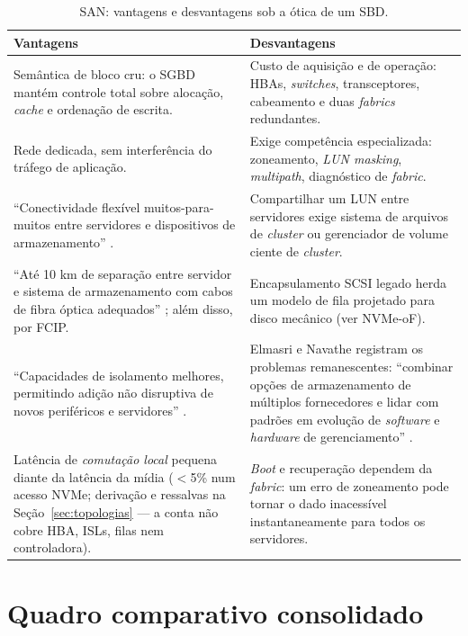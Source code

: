 \documentclass[11pt,a4paper]{article}
\begin{document}
\begin{table}[H]
\centering
\caption{SAN: vantagens e desvantagens sob a ótica de um SBD.}
\label{tab:vantsan}
{\footnotesize
\begin{tabular}{@{}p{7.4cm}p{7.4cm}@{}}
\toprule
\textbf{Vantagens} & \textbf{Desvantagens} \\
\midrule
Semântica de bloco cru: o SGBD mantém controle total sobre alocação, \textit{cache} e ordenação de
escrita. & Custo de aquisição e de operação: HBAs, \textit{switches}, transceptores, cabeamento e
duas \textit{fabrics} redundantes. \\
Rede dedicada, sem interferência do tráfego de aplicação. & Exige competência especializada:
zoneamento, \textit{LUN masking}, \textit{multipath}, diagnóstico de \textit{fabric}. \\
``Conectividade flexível muitos-para-muitos entre servidores e dispositivos de armazenamento''
\cite{elmasri2018}. & Compartilhar um LUN entre servidores exige sistema de arquivos de
\textit{cluster} ou gerenciador de volume ciente de \textit{cluster}. \\
``Até 10 km de separação entre servidor e sistema de armazenamento com cabos de fibra óptica
adequados'' \cite{elmasri2018}; além disso, por FCIP. & Encapsulamento SCSI legado herda um modelo
de fila projetado para disco mecânico (ver NVMe-oF). \\
``Capacidades de isolamento melhores, permitindo adição não disruptiva de novos periféricos e
servidores'' \cite{elmasri2018}. & Elmasri e Navathe registram os problemas remanescentes:
``combinar opções de armazenamento de múltiplos fornecedores e lidar com padrões em evolução de
\textit{software} e \textit{hardware} de gerenciamento'' \cite{elmasri2018}. \\
Latência de \emph{comutação local} pequena diante da latência da mídia ($<$5\% num acesso NVMe;
derivação e ressalvas na Seção~\ref{sec:topologias} --- a conta não cobre HBA, ISLs, filas nem
controladora). & \textit{Boot} e recuperação dependem da \textit{fabric}: um erro de
zoneamento pode tornar o dado inacessível instantaneamente para todos os servidores. \\
\bottomrule
\end{tabular}}
\end{table}

\section{Quadro comparativo consolidado}
\label{sec:comparativo}
\end{document}
